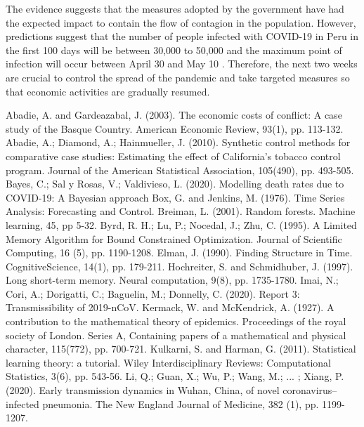 \documentclass[12pt]{article}
\begin{document}
The evidence suggests that the measures adopted by the government have had the expected impact to contain the flow of contagion in the population. However, predictions suggest that the number of people infected with COVID-19 in Peru in the first 100 days will be between 30,000 to 50,000 and the maximum point of infection will occur between April 30 and May 10 . Therefore, the next two weeks are crucial to control the spread of the pandemic and take targeted measures so that economic activities are gradually resumed.

\clearpage

\begin{thebibliography}{99}
 Abadie, A. and Gardeazabal, J. (2003). The economic costs of conflict: A case study of the Basque Country. American Economic Review, 93(1), pp. 113-132.
 Abadie, A.; Diamond, A.; Hainmueller, J. (2010). Synthetic control methods for comparative case studies: Estimating the effect of California’s tobacco control program. Journal of the American Statistical Association, 105(490), pp. 493-505.
 Bayes, C.; Sal y Rosas, V.; Valdivieso, L. (2020). Modelling death rates due to COVID-19: A Bayesian approach
 Box, G. and Jenkins, M. (1976). Time Series Analysis: Forecasting and Control.
 Breiman, L. (2001). Random forests. Machine learning, 45, pp 5-32.
 Byrd, R. H.; Lu, P.; Nocedal, J.; Zhu, C. (1995). A Limited Memory Algorithm for Bound Constrained Optimization. Journal of Scientific Computing, 16 (5), pp. 1190-1208.
 Elman, J. (1990). Finding Structure in Time. CognitiveScience, 14(1), pp. 179-211.
 Hochreiter, S. and Schmidhuber, J. (1997). Long short-term memory. Neural computation, 9(8), pp. 1735-1780.
 Imai, N.; Cori, A.; Dorigatti, C.; Baguelin, M.; Donnelly, C. (2020). Report 3: Transmissibility of 2019-nCoV.
 Kermack, W. and McKendrick, A. (1927). A contribution to the mathematical theory of epidemics. Proceedings of the royal society of London. Series A, Containing papers of a mathematical and physical character, 115(772), pp. 700-721.
 Kulkarni, S. and Harman, G. (2011). Statistical learning theory: a tutorial. Wiley Interdisciplinary Reviews: Computational Statistics, 3(6), pp. 543-56.
 Li, Q.; Guan, X.; Wu, P.; Wang, M.; ... ; Xiang, P. (2020). Early transmission dynamics in Wuhan, China, of novel coronavirus–infected pneumonia. The New England Journal of Medicine, 382 (1), pp. 1199-1207.

\end{thebibliography}
\end{document}
